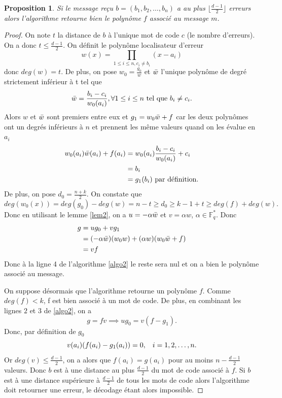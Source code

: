 \documentclass{article}
\newtheorem{proposition}{Proposition}
\theoremstyle{definition}
\theoremstyle{remark}
\begin{document}
\begin{proposition}
\label{prop4}
    Si le message reçu $b = (b_1, b_2, \dots, b_n)$ a au plus $ \lfloor \frac{d-1}{2} \rfloor$ erreurs alors l'algorithme retourne bien le polynôme $f$ associé au message $m$.
\end{proposition}

\begin{proof}
    On note $t$ la distance de $b$ à l'unique mot de code $c$ (le nombre d'erreurs). On a donc $t \le \frac{d-1}{2}$.
    On définit le polynôme localisateur d'erreur
    \[ w(x) = \prod_{1 \le i \le n, c_i \ne b_i} (x - a_i) \]
    donc $deg(w) = t$. De plus, on pose
    $w_0 = \frac{g_0}{w}$ et $\Bar{w}$ l'unique polynôme de degré strictement inférieur à t tel que
    \[ \Bar{w} = \frac{b_i - c_i}{w_0(a_i)}, \forall 1 \le i \le n \text{ tel que } b_i \ne c_i. \]
    Alors $w$ et $\Bar{w}$ sont premiers entre eux et $ g_1 = w_0 \Bar{w} + f$ car les deux polynômes ont un degrés inférieurs à $n$ et prennent les même valeurs quand on les évalue en $a_i$
    \begin{align*}
        w_0(a_i) \Bar{w}(a_i) + f(a_i) &= w_0(a_i) \frac{b_i - c_i}{w_0(a_i)} + c_i \\
        &= b_i \\
        &= g_1(b_i) \text{ par définition.}
    \end{align*}
    De plus, on pose $d_0 = \frac{n + k}{2}$. On constate que
    \[ deg(w_0(x)) = deg(g_0) - deg(w) = n - t \ge d_0 \ge k - 1 + t \ge deg(f) + deg(w). \]
    Donc en utilisant le lemme \ref{lem2}, on a $u = -\alpha \Bar{w}$ et $v = \alpha w$, $\alpha \in \mathbb{F}_q^*$. Donc
    \begin{align*}
        g &= u g_0 + v g_1 \\
          &= (-\alpha \Bar{w}) (w_0 w) + (\alpha w) (w_0 \Bar{w} + f) \\
          &= vf
    \end{align*}
    Donc à la ligne 4 de l'algorithme \ref{algo2} le reste sera nul et on a bien le polynôme associé au message.

    On suppose désormais que l'algorithme retourne un polynôme $f$. Comme $deg(f) < k$, f est bien associé à un mot de code. De plus, en combinant les lignes $2$ et $3$ de \ref{algo2}, on a
    \[ g = fv \implies ug_0 = v(f - g_1). \]
    Donc, par définition de $g_0$
    \[ v(a_i)(f(a_i) - g_1(a_i)) = 0, \hspace{3mm} i = 1, 2, \dots, n. \]
    Or $deg(v) \le \frac{d-1}{2}$, on a alors que $f(a_i) = g(a_i)$ pour au moins $n-\frac{d-1}{2}$ valeurs. Donc $b$ est à une distance au plus $\frac{d-1}{2}$ du mot de code associé à $f$. Si $b$ est à une distance supérieure à $\frac{d-1}{2}$ de tous les mots de code alors l'algorithme doit retourner une erreur, le décodage étant alors impossible.
    \end{proof}
\end{document}
